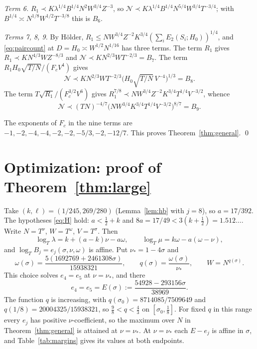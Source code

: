 \documentclass[11pt]{amsart}
\theoremstyle{definition}
\theoremstyle{remark}
\numberwithin{equation}{section}
\newcommand{\cN}{\mathcal{N}}
\begin{document}
\emph{Term 6.} $R_1\prec K\lambda^{1/4}B^{1/4}N^2W^{3/4}Z^{-3}$, so $\cN\prec K\lambda^{1/4}B^{1/4}N^{5/4}W^{3/4}T^{-3/4}$; with $B^{1/4}\asymp N^{1/8}W^{1/2}T^{-3/8}$ this is $B_6$.

\emph{Terms 7, 8, 9.} By H\"older, $R_1\le NW^{3/4}Z^{-2}K^{3/4}(\sum_iE_2(S_i;H_0))^{1/4}$, and \eqref{eq:paircount} at $D=H_0\asymp W^{1/2}N^{1/16}$ has three terms. The term $R_1$ gives $R_1\prec KN^{4/3}WZ^{-8/3}$ and $\cN\prec KN^{2/3}WT^{-2/3}=B_7$. The term $R_1H_0\sqrt{T/N}/(F_cV^4)$ gives
\[
\cN\prec KN^{2/3}WT^{-2/3}\big(H_0\sqrt{T/N}\,V^{-4}\big)^{1/3}=B_8 .
\]
The term $T\sqrt{R_1}/(F_c^{3/2}V^6)$ gives $R_1^{7/8}\prec NW^{3/4}Z^{-2}K^{3/4}T^{1/4}V^{-3/2}$, whence
\[
\cN\prec(TN)^{-4/7}\big(NW^{3/4}K^{3/4}T^{1/4}V^{-3/2}\big)^{8/7}=B_9 .
\]

The exponents of $F_c$ in the nine terms are $-1,-2,-4,-4,-2,-2,-5/3,-2,-12/7$. This proves Theorem~\ref{thm:general}. \qed

\section{Optimization: proof of Theorem~\ref{thm:large}}\label{sec:optimize}

Take $(k,\ell)=(1/245,269/280)$ (Lemma~\ref{lem:hb} with $j=8$), so $a=17/392$. The hypotheses \eqref{eq:H} hold: $a<\frac12+k$ and $8a=17/49<3(k+\frac12)=1.512\ldots$. Write $N=T^\nu$, $W=T^\omega$, $V=T^\sigma$. Then
\[
\log_T\lambda=k+(a-k)\nu-a\omega,\qquad \log_T\mu=k\omega-a(\omega-\nu),
\]
and $\log_TB_j=e_j(\sigma,\nu,\omega)$ is affine. Put $\nu_*=1-4\sigma$ and
\[
\omega(\sigma)=\frac{5(1692769+2461308\sigma)}{15938321},\qquad q(\sigma)=\frac{\omega(\sigma)}{\nu_*},\qquad W=N^{q(\sigma)} .
\]
This choice solves $e_4=e_5$ at $\nu=\nu_*$, and there
\[
e_4=e_5=E(\sigma):=\frac{54928-293156\sigma}{38969}.
\]
The function $q$ is increasing, with $q(\sigma_0)=8714085/7509649$ and $q(1/8)=20004325/15938321$, so $\frac98<q<\frac43$ on $[\sigma_0,\frac18]$. For fixed $q$ in this range every $e_j$ has positive $\nu$-coefficient, so the maximum over $N$ in Theorem~\ref{thm:general} is attained at $\nu=\nu_*$. At $\nu=\nu_*$ each $E-e_j$ is affine in $\sigma$, and Table~\ref{tab:margins} gives its values at both endpoints.
\end{document}
